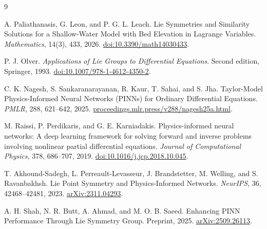 \documentclass[12pt,a4paper]{article}
\begin{document}
\newpage
\begin{thebibliography}{9}
\raggedright
\setlength{\itemsep}{3pt}
\setlength{\parskip}{0pt}
A. Paliathanasis, G. Leon, and P. G. L. Leach. Lie Symmetries and Similarity Solutions for a Shallow-Water Model with Bed Elevation in Lagrange Variables. \emph{Mathematics}, 14(3), 433, 2026.
\href{https://doi.org/10.3390/math14030433}{doi:10.3390/math14030433}.

P. J. Olver. \emph{Applications of Lie Groups to Differential Equations}. Second edition, Springer, 1993.
\href{https://doi.org/10.1007/978-1-4612-4350-2}{doi:10.1007/978-1-4612-4350-2}.

C. K. Nagesh, S. Sankaranarayanan, R. Kaur, T. Sahai, and S. Jha. Taylor-Model Physics-Informed Neural Networks (PINNs) for Ordinary Differential Equations. \emph{PMLR}, 288, 621--642, 2025.
\href{https://proceedings.mlr.press/v288/nagesh25a.html}{proceedings.mlr.press/v288/nagesh25a.html}.

M. Raissi, P. Perdikaris, and G. E. Karniadakis. Physics-informed neural networks: A deep learning framework for solving forward and inverse problems involving nonlinear partial differential equations. \emph{Journal of Computational Physics}, 378, 686--707, 2019.
\href{https://doi.org/10.1016/j.jcp.2018.10.045}{doi:10.1016/j.jcp.2018.10.045}.

T. Akhound-Sadegh, L. Perreault-Levasseur, J. Brandstetter, M. Welling, and S. Ravanbakhsh. Lie Point Symmetry and Physics-Informed Networks. \emph{NeurIPS}, 36, 42468--42481, 2023.
\href{https://arxiv.org/abs/2311.04293}{arXiv:2311.04293}.

A. H. Shah, N. R. Butt, A. Ahmad, and M. O. B. Saeed. Enhancing PINN Performance Through Lie Symmetry Group. Preprint, 2025.
\href{https://arxiv.org/abs/2509.26113}{arXiv:2509.26113}.
\end{thebibliography}
\end{document}
